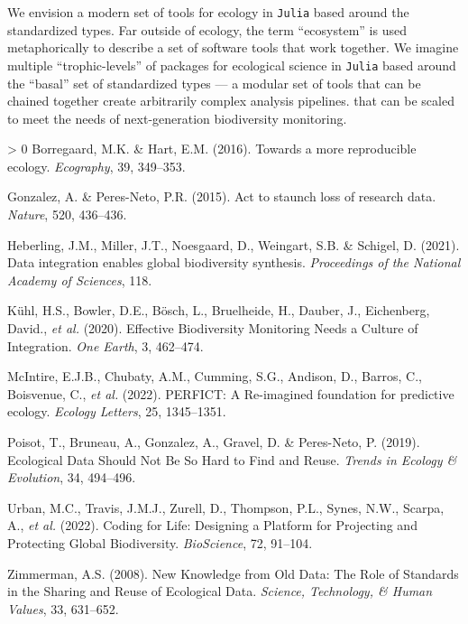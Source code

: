 \documentclass[10pt,oneside]{article}
\newlength{\cslhangindent}
\newenvironment{CSLReferences}[3] %
 {%
  \setlength{\parindent}{0pt}
  \ifodd #1 \everypar{\setlength{\hangindent}{\cslhangindent}}\ignorespaces\fi
  \ifnum #2 > 0
  \setlength{\parskip}{#2\baselineskip}
  \fi
 }%
 {}
\begin{document}
We envision a modern set of tools for ecology in \texttt{Julia} based
around the standardized types. Far outside of ecology, the term
``ecosystem'' is used metaphorically to describe a set of software tools
that work together. We imagine multiple ``trophic-levels'' of packages
for ecological science in \texttt{Julia} based around the ``basal'' set
of standardized types --- a modular set of tools that can be chained
together create arbitrarily complex analysis pipelines. that can be
scaled to meet the needs of next-generation biodiversity monitoring.

\hypertarget{refs}{}
\begin{CSLReferences}{1}{0}
\leavevmode\hypertarget{ref-Borregaard2016MorRep}{}%
Borregaard, M.K. \& Hart, E.M. (2016). Towards a more reproducible
ecology. \emph{Ecography}, 39, 349--353.

\leavevmode\hypertarget{ref-Gonzalez2015ActSta}{}%
Gonzalez, A. \& Peres-Neto, P.R. (2015). Act to staunch loss of research
data. \emph{Nature}, 520, 436--436.

\leavevmode\hypertarget{ref-Heberling2021DatInt}{}%
Heberling, J.M., Miller, J.T., Noesgaard, D., Weingart, S.B. \& Schigel,
D. (2021). Data integration enables global biodiversity synthesis.
\emph{Proceedings of the National Academy of Sciences}, 118.

\leavevmode\hypertarget{ref-Kuhl2020EffBio}{}%
Kühl, H.S., Bowler, D.E., Bösch, L., Bruelheide, H., Dauber, J.,
Eichenberg, David., \emph{et al.} (2020). Effective Biodiversity
Monitoring Needs a Culture of Integration. \emph{One Earth}, 3,
462--474.

\leavevmode\hypertarget{ref-McIntire2022PerRei}{}%
McIntire, E.J.B., Chubaty, A.M., Cumming, S.G., Andison, D., Barros, C.,
Boisvenue, C., \emph{et al.} (2022). PERFICT: A Re-imagined foundation
for predictive ecology. \emph{Ecology Letters}, 25, 1345--1351.

\leavevmode\hypertarget{ref-Poisot2019EcoDat}{}%
Poisot, T., Bruneau, A., Gonzalez, A., Gravel, D. \& Peres-Neto, P.
(2019). Ecological Data Should Not Be So Hard to Find and Reuse.
\emph{Trends in Ecology \& Evolution}, 34, 494--496.

\leavevmode\hypertarget{ref-Urban2022CodLif}{}%
Urban, M.C., Travis, J.M.J., Zurell, D., Thompson, P.L., Synes, N.W.,
Scarpa, A., \emph{et al.} (2022). Coding for Life: Designing a Platform
for Projecting and Protecting Global Biodiversity. \emph{BioScience},
72, 91--104.

\leavevmode\hypertarget{ref-Zimmerman2008NewKno}{}%
Zimmerman, A.S. (2008). New Knowledge from Old Data: The Role of
Standards in the Sharing and Reuse of Ecological Data. \emph{Science,
Technology, \& Human Values}, 33, 631--652.

\end{CSLReferences}
\end{document}
